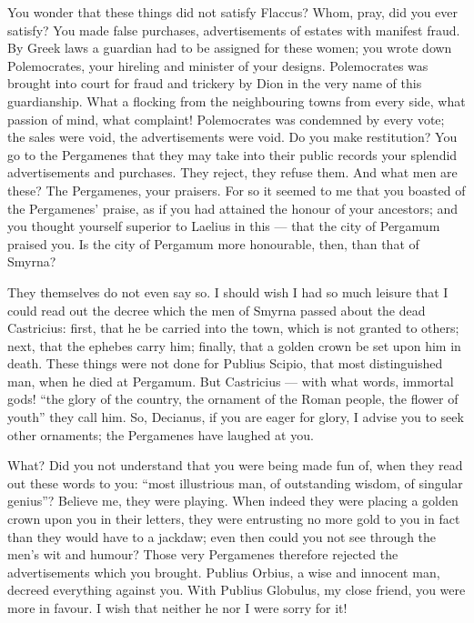  You wonder that these things did not satisfy Flaccus? Whom, pray, did you ever satisfy? You made false purchases, advertisements of estates with manifest fraud. By Greek laws a guardian had to be assigned for these women; you wrote down Polemocrates, your hireling and minister of your designs. Polemocrates was brought into court for fraud and trickery by Dion in the very name of this guardianship. What a flocking from the neighbouring towns from every side, what passion of mind, what complaint! Polemocrates was condemned by every vote; the sales were void, the advertisements were void. Do you make restitution? You go to the Pergamenes that they may take into their public records your splendid advertisements and purchases. They reject, they refuse them. And what men are these? The Pergamenes, your praisers. For so it seemed to me that you boasted of the Pergamenes' praise, as if you had attained the honour of your ancestors; and you thought yourself superior to Laelius in this --- that the city of Pergamum praised you. Is the city of Pergamum more honourable, then, than that of Smyrna?

 They themselves do not even say so. I should wish I had so much leisure that I could read out the decree which the men of Smyrna passed about the dead Castricius: first, that he be carried into the town, which is not granted to others; next, that the ephebes carry him; finally, that a golden crown be set upon him in death. These things were not done for Publius Scipio, that most distinguished man, when he died at Pergamum. But Castricius --- with what words, immortal gods! ``the glory of the country, the ornament of the Roman people, the flower of youth'' they call him. So, Decianus, if you are eager for glory, I advise you to seek other ornaments; the Pergamenes have laughed at you.

 What? Did you not understand that you were being made fun of, when they read out these words to you: ``most illustrious man, of outstanding wisdom, of singular genius''? Believe me, they were playing. When indeed they were placing a golden crown upon you in their letters, they were entrusting no more gold to you in fact than they would have to a jackdaw; even then could you not see through the men's wit and humour? Those very Pergamenes therefore rejected the advertisements which you brought. Publius Orbius, a wise and innocent man, decreed everything against you. With Publius Globulus, my close friend, you were more in favour. I wish that neither he nor I were sorry for it!

